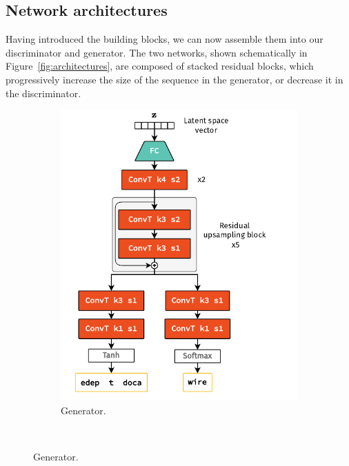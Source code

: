 \subsection{Network architectures}
Having introduced the building blocks, we can now assemble them into our
discriminator and generator. The two networks, shown schematically in
Figure~\ref{fig:architectures}, are composed of stacked residual blocks, which
progressively increase the size of the sequence in the generator, or decrease it
in the discriminator.

\begin{figure}
    \centering
    \begin{subfigure}[t]{0.49\textwidth}
        \centering
        \caption{Generator.}
        \vspace{0.3cm}
        \includegraphics[width=\textwidth]{chapter4/network_architectures_gen.drawio.pdf}
        \hspace{-1cm} %
    \end{subfigure}
    \\
    \vspace{0.5cm}

\end{figure}
